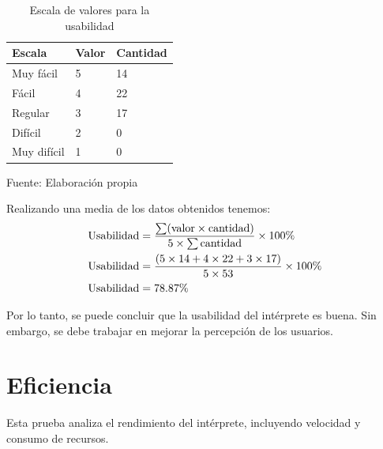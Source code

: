 \begin{table}[!h]
  \begin{center}
    \begin{tabularx}{0.9\textwidth}{|X|X|X|}
      \hline
      \textbf{Escala} & \textbf{Valor} & \textbf{Cantidad} \\
      \hline
      Muy fácil & 5 & 14 \\
      \hline
      Fácil & 4 & 22 \\
      \hline
      Regular & 3 & 17 \\
      \hline
      Difícil & 2 & 0 \\
      \hline
      Muy difícil & 1 & 0 \\
      \hline
    \end{tabularx}
  \end{center}
  \caption{Escala de valores para la usabilidad}
  \centering Fuente: Elaboración propia
  \label{tab:usabilidad-escala}
\end{table}

Realizando una media de los datos obtenidos tenemos:
\begin{equation*}
  \begin{split}
    \textnormal{Usabilidad} & = \frac{\sum (\textnormal{valor} \times \textnormal{cantidad})}{5 \times \sum \textnormal{cantidad}} \times 100\% \\
    \textnormal{Usabilidad} & = \frac{(5 \times 14 + 4 \times 22 + 3 \times 17)}{5 \times 53} \times 100\% \\
    \textnormal{Usabilidad} & = 78.87\%
  \end{split}
\end{equation*}

Por lo tanto, se puede concluir que la usabilidad del intérprete es buena. Sin embargo, se debe trabajar en mejorar la percepción de los usuarios.

\section{Eficiencia}
Esta prueba analiza el rendimiento del intérprete, incluyendo velocidad y consumo de recursos.


